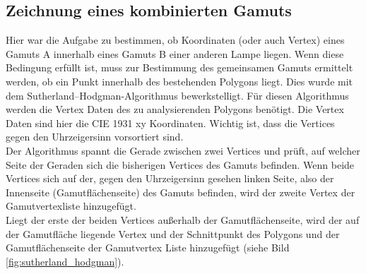 \documentclass[11pt]{scrartcl}
\begin{document}
\subsection{Zeichnung eines kombinierten Gamuts}
Hier war die Aufgabe zu bestimmen, ob Koordinaten (oder auch Vertex) eines Gamuts A innerhalb eines Gamuts B einer anderen Lampe liegen.
Wenn diese Bedingung erfüllt ist, muss zur Bestimmung des gemeinsamen Gamuts ermittelt werden, ob ein Punkt innerhalb des bestehenden Polygons liegt. Dies
wurde mit dem Sutherland–Hodgman-Algorithmus \cite{sutherlandHodgman} bewerkstelligt. Für diesen Algorithmus werden die Vertex Daten des zu analysierenden
Polygons benötigt. Die Vertex Daten sind hier die CIE 1931 xy Koordinaten. Wichtig ist, dass die Vertices gegen den Uhrzeigersinn vorsortiert sind.\\
Der Algorithmus spannt die Gerade zwischen zwei Vertices und prüft, auf welcher Seite der Geraden sich die bisherigen Vertices des Gamuts befinden. Wenn
beide Vertices sich auf der, gegen den Uhrzeigersinn gesehen linken Seite, also der Innenseite (Gamutflächenseite) des Gamuts befinden, wird der zweite
Vertex der Gamutvertexliste hinzugefügt.\\
Liegt der erste der beiden Vertices außerhalb der Gamutflächenseite, wird der auf der Gamutfläche liegende Vertex und der Schnittpunkt des Polygons und der
Gamutflächenseite der Gamutvertex Liste hinzugefügt (siehe Bild \ref{fig:sutherland_hodgman}).\\
\end{document}
